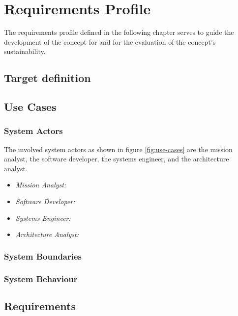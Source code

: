 \chapter{Requirements Profile}
\label{sec:requirements-profile}
The requirements profile defined in the following chapter serves to guide the development of the concept for \topic and for the evaluation of the concept's sustainability.

\section{Target definition}
\label{sec:target-definition}

\section{Use Cases}
\label{sec:use-cases}



\subsection{System Actors}
\label{sec:involved-actors}
The involved system actors as shown in figure \ref{fig:use-cases} are the mission analyst, the software developer, the systems engineer, and the architecture analyst.
\begin{itemize}
    \item \emph{Mission Analyst:}
    \item \emph{Software Developer:}
    \item \emph{Systems Engineer:}
    \item \emph{Architecture Analyst:}
\end{itemize}

\subsection{System Boundaries}
\label{sec:system-boundaries}

\subsection{System Behaviour}
\label{sec:system-behaviour}

\section{Requirements}
\label{sec:requirements}
